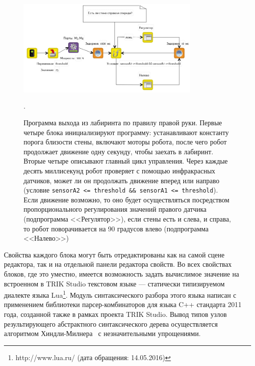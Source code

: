 \documentclass[conference]{IEEEtran}
\begin{document}
\begin{figure}[ht]
    \centering
    \includegraphics[width=0.8\textwidth]{TS_CF_Labyrinth_Diagram.png}
    \caption{Программа выхода из лабиринта по правилу правой руки. Первые четыре блока инициализируют программу: устанавливают константу порога близости стены, включают моторы робота, после чего робот продолжает движение одну секунду, чтобы заехать в лабиринт. Вторые четыре описывают главный цикл управления. Через каждые десять миллисекунд робот проверяет с помощью инфракрасных датчиков, может ли он продолжать движение вперед или направо (условие \texttt{sensorA2 <= threshold \&\& sensorA1 <= threshold}). Если движение возможно, то оно будет осуществляться посредством пропорционального регулирования значений правого датчика (подпрограмма <<Регулятор>>), если стены есть и слева, и справа, то робот поворачивается на 90 градусов влево (подпрограмма <<Налево>>)}.
    \label{image:TS_CF_Example}
\end{figure}

Свойства каждого блока могут быть отредактированы как на самой сцене редактора, так и на отдельной панели редактора свойств. Во всех свойствах блоков, где это уместно, имеется возможность задать вычислимое значение на встроенном в TRIK Studio текстовом языке --- статически типизируемом диалекте языка Lua\footnote{http://www.lua.ru/ (дата обращения: 14.05.2016)}. Модуль синтаксического разбора этого языка написан с применением библиотеки парсер-комбинаторов для языка C++ стандарта 2011 года, созданной также в рамках проекта TRIK Studio. Вывод типов узлов результирующего абстрактного синтаксического дерева осуществляется алгоритмом Хиндли-Милнера~\cite{damas1982principal} с незначительными упрощениями.
\end{document}

